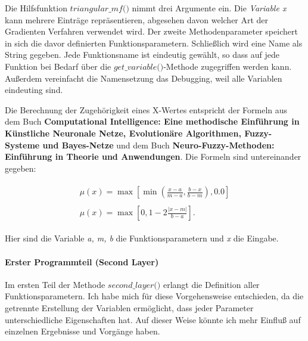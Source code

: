 Die Hilfsfunktion \(\textit{triangular_mf()}\) nimmt drei Argumente ein.
Die \emph{Variable x} kann mehrere Einträge repräsentieren, abgesehen
davon welcher Art der Gradienten Verfahren verwendet wird. Der zweite
Methodenparameter speichert in sich die davor definierten
Funktionsparametern. Schließlich wird eine Name als String gegeben. Jede
Funktionsname ist eindeutig gewählt, so dass auf jede Funktion bei
Bedarf über die \(\textit{get_variable()}\)-Methode zugegriffen werden
kann. Außerdem vereinfacht die Namensetzung das Debugging, weil alle
Variablen eindeuting sind.

Die Berechnung der Zugehörigkeit eines X-Wertes entspricht der Formeln
aus dem Buch \textbf{Computational Intelligence: Eine methodische
Einführung in Künstliche Neuronale Netze, Evolutionäre Algorithmen,
Fuzzy-Systeme und Bayes-Netze} und dem Buch
\textbf{Neuro-Fuzzy-Methoden: Einführung in Theorie und Anwendungen}.
Die Formeln sind untereinander gegeben:

\[
\begin{align}
    \begin{split}\label{mf_typ0}
        \mu(x) = \max[\min(\frac{x - a}{m - a}, \frac{b - x}{b - m}), 0.0]
    \end{split}\\
    \begin{split}\label{mf_typ1} 
        \mu(x) = \max[0, 1 - 2\frac{\lvert x - m\rvert}{b - a}].
    \end{split}
\end{align}
\]

Hier sind die Variable \emph{a, m, b} die Funktionsparametern und
\emph{x} die Eingabe.

\hypertarget{erster-programmteil-second-layer}{%
\paragraph{Erster Programmteil (Second
Layer)}\label{erster-programmteil-second-layer}}

Im ersten Teil der Methode \(\textit{second_layer()}\) erlangt die
Definition aller Funktionsparametern. Ich habe mich für diese
Vorgehensweise entschieden, da die getrennte Erstellung der Variablen
ermöglicht, dass jeder Parameter unterschiedliche Eigenschaften hat. Auf
dieser Weise könnte ich mehr Einfluß auf einzelnen Ergebnisse und
Vorgänge haben.

